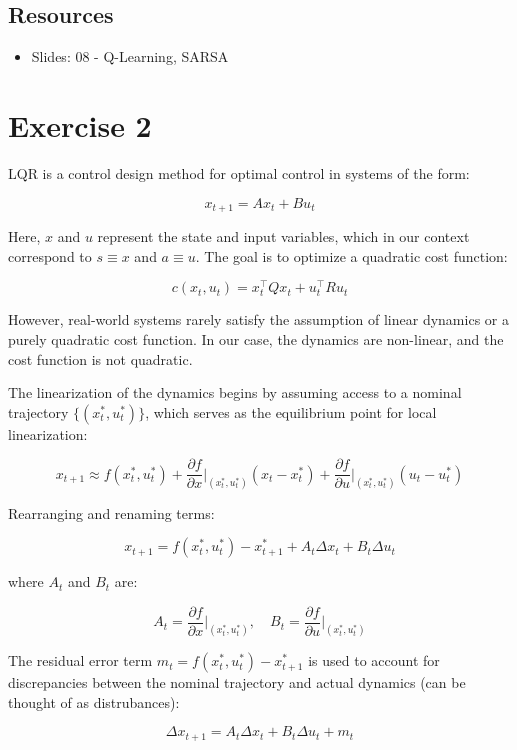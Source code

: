 \subsection*{Resources}

\begin{itemize}
    \item Slides: 08 - Q-Learning, SARSA
\end{itemize}

\section*{Exercise 2}

LQR is a control design method for optimal control in systems of the form:

\[
    x_{t+1} = A x_t + B u_t
\]

Here, $x$ and $u$ represent the state and input variables, which in our context correspond to $s \equiv x$ and $a \equiv u$. The goal is to optimize a quadratic cost function:

\[
    c(x_t, u_t) = x_t^\top Q x_t + u_t^\top R u_t
\]

However, real-world systems rarely satisfy the assumption of linear dynamics or a purely quadratic cost function. In our case, the dynamics are non-linear, and the cost function is not quadratic.

The linearization of the dynamics begins by assuming access to a nominal trajectory $\{(x_t^*, u_t^*)\}$, which serves as the equilibrium point for local linearization:

\[
    x_{t+1} \approx f(x_t^*, u_t^*) + \frac{\partial f}{\partial x} \bigg|_{(x_t^*, u_t^*)} (x_t - x_t^*) + \frac{\partial f}{\partial u} \bigg|_{(x_t^*, u_t^*)} (u_t - u_t^*)
\]

Rearranging and renaming terms:

\[
    x_{t+1} = f(x_t^*, u_t^*) - x^*_{t+1} + A_t \Delta x_t + B_t \Delta u_t
\]

where $A_t$ and $B_t$ are:

\[
    A_t = \frac{\partial f}{\partial x} \bigg|_{(x_t^*, u_t^*)}, \quad B_t = \frac{\partial f}{\partial u} \bigg|_{(x_t^*, u_t^*)}
\]

The residual error term  $m_t = f(x_t^*, u_t^*) - x^*_{t+1}$ is used to account for discrepancies between the nominal trajectory and actual dynamics (can be thought of as distrubances):

\[
    \Delta x_{t+1} = A_t \Delta x_t + B_t \Delta u_t + m_t
\]

